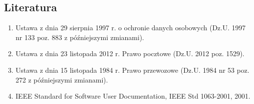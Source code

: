 

\subsection{Literatura}
\label{subsec:Literatura}
\begin{enumerate}
\item Ustawa z dnia 29 sierpnia 1997 r. o ochronie danych osobowych (Dz.U. 1997 nr 133 poz. 883 z późniejszymi zmianami).
\item Ustawa z dnia 23 listopada 2012 r. Prawo pocztowe (Dz.U. 2012 poz. 1529).
\item Ustawa z dnia 15 listopada 1984 r. Prawo przewozowe (Dz.U. 1984 nr 53 poz. 272 z późniejszymi zmianami).
\item IEEE Standard for Software User Documentation, IEEE Std 1063-2001, 2001.
\end{enumerate}